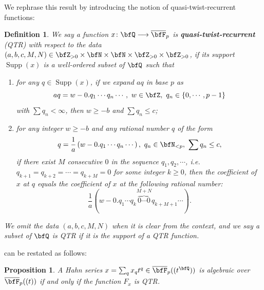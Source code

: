 \documentclass[english,oneside]{smfart}
\newcommand{\opn}[1]{\operatorname{#1}}
\newcommand{\lto}{\longrightarrow}
\newtheorem{proposition}[theorem]{Proposition}
\newtheorem{definition}[theorem]{Definition}
\begin{document}
We rephrase this result by introducing the notion of quasi-twist-recurrent functions:
\begin{definition}\label{def:16557}
    We say a function $x\colon\bfQ\lto\overline{\bfF}_p$ is \textbf{quasi-twist-recurrent} (QTR) with respect to the data $(a,b,c,M,N)\in \bfZ_{>0}\times \bfN\times \bfN\times \bfZ_{>0}\times \bfZ_{>0}$, if its support $\opn{Supp}(x)$ is a well-ordered subset of $\bfQ$ such that %
    \begin{enumerate}
        \item for any $q\in\opn{Supp}(x)$, if we expand $aq$ in base $p$ as
              $$aq=w-0.q_1\cdots q_n\cdots,\ w\in\bfZ,\ q_n\in\{0,\cdots,p-1\}$$
              with $\sum q_n<\infty$, then $w\geq -b$ and $\sum q_n\leq c$;
        \item for any integer $w\geq -b$ and any rational number $q$ of the form
              $$q=\frac{1}{a}\left(w-0.q_1\cdots q_n\cdots\right),\ q_n\in\bfN_{<p},\ \sum q_n\leq c,$$
              if there exist $M$ consecutive $0$ in the sequence $q_1,q_2,\cdots$, i.e. $q_{k+1}=q_{k+2}=\cdots=q_{k+M}=0$ for some integer $k\geq 0$, then the coefficient of $x$ at $q$ equals the coefficient of $x$ at the following rational number:
              $$\frac{1}{a}\left(w-0.q_1\cdots q_k\overbrace{0\cdots0}^{M+N}q_{k+M+1}\cdots\right).$$
    \end{enumerate}
    We omit the data $(a,b,c,M,N)$ when it is clear from the context, and we say a subset of $\bfQ$ is QTR if it is the support of a QTR function.
\end{definition}
 can be restated as follows:
\begin{proposition}\label{prop:54845}
    A Hahn series $x=\sum_q x_q t^q\in\overline{\bfF}_p((t^\bfQ))$ is algebraic over $\overline{\bfF}_p((t))$ if and only if the function $F_x$ is QTR.
\end{proposition}
\end{document}

